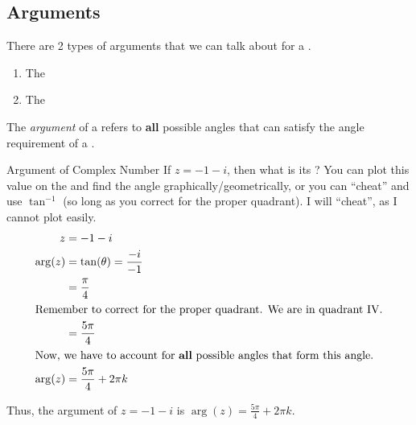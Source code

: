 \subsection{Arguments}\label{subsec:Complex_Number_Arguments}
There are 2 types of arguments that we can talk about for a .
\begin{enumerate}[noitemsep]
\item The 
\item The 
\end{enumerate}

\begin{definition}[Argument]\label{def:Complex_Number_Argument}
  The \emph{argument} of a  refers to \textbf{all} possible angles that can satisfy the angle requirement of a .
\end{definition}

\begin{example}{Argument of Complex Number}
  If $z = -1 - i$, then what is its \textbf{}?
  \tcblower{}
  You can plot this value on the  and find the angle graphically/geometrically, or you can ``cheat'' and use $\tan^{-1}$ (so long as you correct for the proper quadrant).
  I will ``cheat'', as I cannot plot easily.
  \begin{align*}
    z &= -1 - i \\
    \arg(z) &= \tan(\theta) = \frac{-i}{-1} \\
      &= \frac{\pi}{4} \\
    \shortintertext{Remember to correct for the proper quadrant. We are in quadrant IV.}
      &= \frac{5 \pi}{4} \\
    \intertext{Now, we have to account for \textbf{all} possible angles that form this angle.}
    \arg(z) &= \frac{5 \pi}{4} + 2 \pi k
  \end{align*}

  Thus, the argument of $z = -1 - i$ is $\arg(z) = \frac{5 \pi}{4} + 2 \pi k$.
\end{example}


